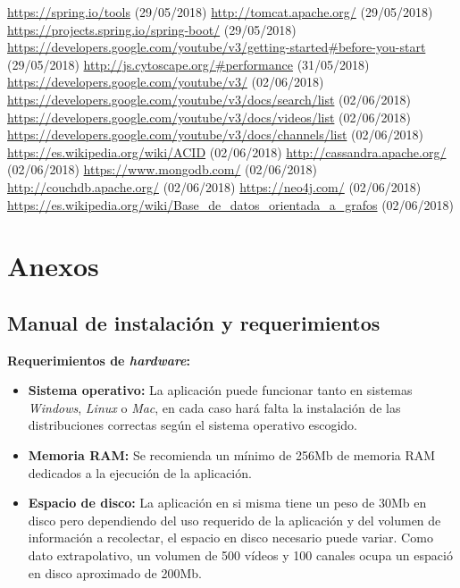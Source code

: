 \documentclass[11pt,a4paper]{article}
\begin{document}
\begin{thebibliography}{0}
   \url{https://spring.io/tools} (29/05/2018) 
   \url{http://tomcat.apache.org/} (29/05/2018) 
   \url{https://projects.spring.io/spring-boot/} (29/05/2018) 
   \url{https://developers.google.com/youtube/v3/getting-started#before-you-start} (29/05/2018) 
   \url{http://js.cytoscape.org/#performance} (31/05/2018) 
   \url{https://developers.google.com/youtube/v3/} (02/06/2018) 
   \url{https://developers.google.com/youtube/v3/docs/search/list} (02/06/2018)  
   \url{https://developers.google.com/youtube/v3/docs/videos/list} (02/06/2018)  
   \url{https://developers.google.com/youtube/v3/docs/channels/list} (02/06/2018)
   \url{https://es.wikipedia.org/wiki/ACID} (02/06/2018)  
   \url{http://cassandra.apache.org/} (02/06/2018)
   \url{https://www.mongodb.com/} (02/06/2018)
   \url{http://couchdb.apache.org/} (02/06/2018)
   \url{https://neo4j.com/} (02/06/2018)
   \url{https://es.wikipedia.org/wiki/Base_de_datos_orientada_a_grafos} (02/06/2018)    
\end{thebibliography}
\newpage 


\section{Anexos}
\bigskip

\subsection{Manual de instalación y requerimientos}\label{Manual} 
\noindent\textbf{Requerimientos de \textit{hardware}:}
\begin{itemize}
\item \textbf{Sistema operativo:} La aplicación puede funcionar tanto en sistemas \textit{Windows}, \textit{Linux} o \textit{Mac}, en cada caso hará falta la instalación de las distribuciones correctas según el sistema operativo escogido.
\item \textbf{Memoria RAM:} Se recomienda un mínimo de 256Mb de memoria RAM dedicados a la ejecución de la aplicación.
\item \textbf{Espacio de disco:} La aplicación en si misma tiene un peso de 30Mb en disco pero dependiendo del uso requerido de la aplicación y del volumen de información a recolectar, el espacio en disco necesario puede variar. Como dato extrapolativo, un volumen de 500 vídeos y 100 canales ocupa un espació en disco aproximado de 200Mb.
\end{itemize}
\end{document}
